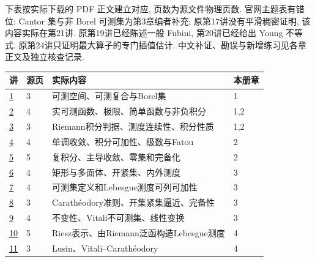 \noindent 下表按实际下载的 PDF 正文建立对应, 页数为源文件物理页数. 官网主题表有错位: Cantor 集与非 Borel 可测集为第3章编者补充; 原第17讲没有平滑稠密证明, 该内容实际在第21讲. 原第19讲已经陈述一般 Fubini, 第20讲已经给出 Young 不等式. 原第24讲只证明最大算子的专门插值估计. 中文补证、勘误与新增练习见各章正文及独立核查记录.

\begin{longtable}{@{}p{}p{}p{}p{}@{}}
\toprule 讲 & 源页 & 实际内容 & 本册章\\\midrule\endhead
\href{https://ocw.mit.edu/courses/18-125-measure-and-integration-fall-2003/resources/18125_lec1/}{1} & 3 & 可测空间、可测复合与Borel集 & 1 \\
\href{https://ocw.mit.edu/courses/18-125-measure-and-integration-fall-2003/resources/18125_lec2/}{2} & 4 & 实可测函数、极限、简单函数与非负积分 & 1,2 \\
\href{https://ocw.mit.edu/courses/18-125-measure-and-integration-fall-2003/resources/18125_lec3/}{3} & 3 & Riemann积分判据、测度连续性、积分性质 & 1,2 \\
\href{https://ocw.mit.edu/courses/18-125-measure-and-integration-fall-2003/resources/18125_lec4/}{4} & 4 & 单调收敛、积分可加性、级数与Fatou & 2 \\
\href{https://ocw.mit.edu/courses/18-125-measure-and-integration-fall-2003/resources/18125_lec5/}{5} & 5 & 复积分、主导收敛、零集和完备化 & 2 \\
\href{https://ocw.mit.edu/courses/18-125-measure-and-integration-fall-2003/resources/18125_lec6/}{6} & 4 & 矩形与多面体、开紧集、内外测度 & 3 \\
\href{https://ocw.mit.edu/courses/18-125-measure-and-integration-fall-2003/resources/18125_lec7/}{7} & 4 & 可测集定义和Lebesgue测度可列可加性 & 3 \\
\href{https://ocw.mit.edu/courses/18-125-measure-and-integration-fall-2003/resources/18125_lec8/}{8} & 3 & Carathéodory准则、开集紧集逼近、完备性 & 3 \\
\href{https://ocw.mit.edu/courses/18-125-measure-and-integration-fall-2003/resources/18125_lec9/}{9} & 4 & 不变性、Vitali不可测集、线性变换 & 3 \\
\href{https://ocw.mit.edu/courses/18-125-measure-and-integration-fall-2003/resources/18125_lec10/}{10} & 5 & Riesz表示、由Riemann泛函构造Lebesgue测度 & 4 \\
\href{https://ocw.mit.edu/courses/18-125-measure-and-integration-fall-2003/resources/18125_lec11/}{11} & 3 & Lusin、Vitali–Carathéodory & 4 \\

\end{longtable}
